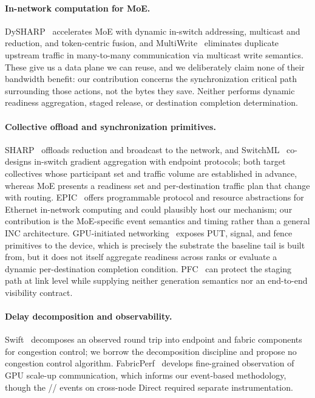 \paragraph{In-network computation for MoE.}
DySHARP~\cite{dysharp} accelerates MoE with dynamic in-switch addressing, multicast and
reduction, and token-centric fusion, and MultiWrite~\cite{multiwrite} eliminates
duplicate upstream traffic in many-to-many communication via multicast write semantics.
These give us a data plane we can reuse, and we deliberately claim none of their
bandwidth benefit: our contribution concerns the synchronization critical path
surrounding those actions, not the bytes they save. Neither performs dynamic readiness
aggregation, staged release, or destination completion determination.

\paragraph{Collective offload and synchronization primitives.}
SHARP~\cite{sharp} offloads reduction and broadcast to the network, and
SwitchML~\cite{switchml} co-designs in-switch gradient aggregation with endpoint
protocols; both target collectives whose participant set and traffic volume are
established in advance, whereas MoE presents a readiness set and per-destination traffic
plan that change with routing. EPIC~\cite{epic} offers programmable protocol and
resource abstractions for Ethernet in-network computing and could plausibly host our
mechanism; our contribution is the MoE-specific event semantics and timing rather than a
general INC architecture. GPU-initiated networking~\cite{gin} exposes PUT, signal, and
fence primitives to the device, which is precisely the substrate the baseline tail is
built from, but it does not itself aggregate readiness across ranks or evaluate a
dynamic per-destination completion condition. PFC~\cite{pfc} can protect the staging
path at link level while supplying neither generation semantics nor an end-to-end
visibility contract.

\paragraph{Delay decomposition and observability.}
Swift~\cite{swift} decomposes an observed round trip into endpoint and fabric components
for congestion control; we borrow the decomposition discipline and propose no congestion
control algorithm. FabricPerf~\cite{fabricperf} develops fine-grained observation of GPU
scale-up communication, which informs our event-based methodology, though the
\ready{}/\data{}/\done{} events on cross-node Direct required separate instrumentation.
